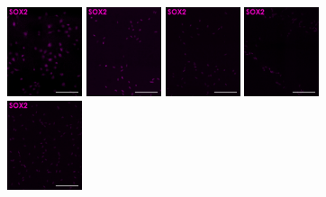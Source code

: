 \documentclass[onecolumn,10pt]{asme2ej}
\begin{document}
\begin{figure}[h]
	\includegraphics[width=0.196\textwidth]{figures/IF/charac(light)/d0-s}
	\includegraphics[width=0.196\textwidth]{figures/IF/charac(light)/d3-s}
	\includegraphics[width=0.196\textwidth]{figures/IF/charac(light)/d7-s}
	\includegraphics[width=0.196\textwidth]{figures/IF/charac(light)/d14-s}
	\includegraphics[width=0.196\textwidth]{figures/IF/charac(light)/d21-s}
	

\end{figure}
\end{document}
